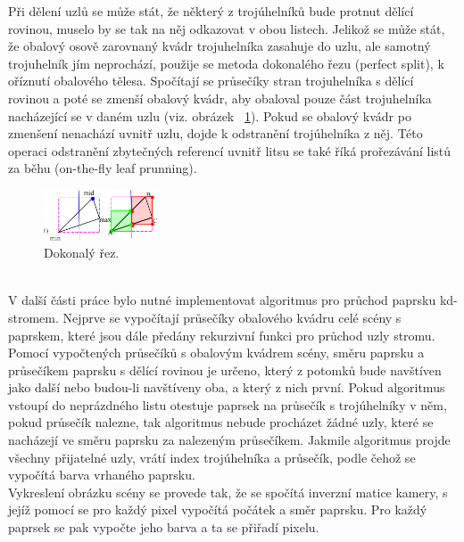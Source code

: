 \documentclass[report,11pt]{elsarticle}
\begin{document}
Při dělení uzlů se může stát, že některý z trojúhelníků bude protnut dělící rovinou, muselo by se tak na něj odkazovat v obou listech. Jelikož se může stát, že obalový osově zarovnaný kvádr trojuhelníka zasahuje do uzlu, ale samotný trojuhelník jím neprochází, použije se metoda dokonalého řezu (perfect split), k oříznutí obalového tělesa. Spočítají se průsečíky stran trojuhelníka s dělící rovinou a poté se zmenší obalový kvádr, aby obaloval pouze část trojuhelníka nacházející se v daném uzlu (viz. obrázek ~\ref{fig:fig1}).  Pokud se obalový kvádr po zmenšení nenachází uvnitř uzlu, dojde k odstranění trojúhelníka z něj. Této operaci odstranění zbytečných referencí uvnitř litsu se také říká prořezávání listů za běhu (on-the-fly leaf prunning). \cite{Improv}\\
\begin{figure}[!ht]
\begin{center}
  \includegraphics[width=0.3\textwidth]{tris}
\caption{{\label{fig:fig1}}Dokonalý řez.}
\end{center}
\end{figure}
\\

V další části práce bylo nutné implementovat algoritmus pro průchod paprsku kd-stromem. Nejprve se vypočítají průsečíky obalového kvádru celé scény s paprskem, které jsou dále předány rekurzivní funkci pro průchod uzly stromu. Pomocí vypočtených průsečíků s obalovým kvádrem scény, směru paprsku a průsečíkem paprsku s dělící rovinou je určeno, který z potomků bude navštíven jako další nebo budou-li navštíveny oba, a který z nich první. Pokud algoritmus vstoupí do neprázdného listu otestuje paprsek na průsečík s trojúhelníky v něm, pokud průsečík nalezne, tak algoritmus nebude procházet žádné uzly, které se nacházejí ve směru paprsku za nalezeným průsečíkem. Jakmile algoritmus projde všechny přijatelné uzly, vrátí index trojúhelníka a průsečík, podle čehož se vypočítá barva vrhaného paprsku.\\

Vykreslení obrázku scény se provede tak, že se spočítá inverzní matice kamery, s jejíž pomocí se pro každý pixel vypočítá počátek a směr paprsku. Pro každý paprsek se pak vypočte jeho barva a ta se přiřadí pixelu.\\
\end{document}
